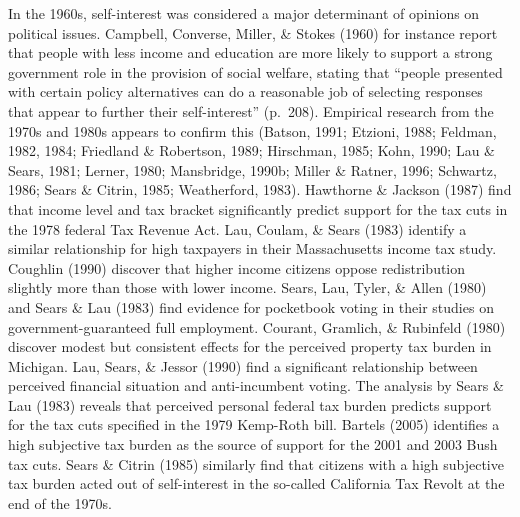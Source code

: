 \documentclass[12pt,econ]{sources/authesis}
\begin{document}
In the 1960s, self-interest was considered a major determinant of opinions on political issues. Campbell, Converse, Miller, \& Stokes (1960) for instance report that people with less income and education are more likely to support a strong government role in the provision of social welfare, stating that ``people presented with certain policy alternatives can do a reasonable job of selecting responses that appear to further their self-interest'' (p.~208). Empirical research from the 1970s and 1980s appears to confirm this (Batson, 1991; Etzioni, 1988; Feldman, 1982, 1984; Friedland \& Robertson, 1989; Hirschman, 1985; Kohn, 1990; Lau \& Sears, 1981; Lerner, 1980; Mansbridge, 1990b; Miller \& Ratner, 1996; Schwartz, 1986; Sears \& Citrin, 1985; Weatherford, 1983). Hawthorne \& Jackson (1987) find that income level and tax bracket significantly predict support for the tax cuts in the 1978 federal Tax Revenue Act. Lau, Coulam, \& Sears (1983) identify a similar relationship for high taxpayers in their Massachusetts income tax study. Coughlin (1990) discover that higher income citizens oppose redistribution slightly more than those with lower income. Sears, Lau, Tyler, \& Allen (1980) and Sears \& Lau (1983) find evidence for pocketbook voting in their studies on government-guaranteed full employment. Courant, Gramlich, \& Rubinfeld (1980) discover modest but consistent effects for the perceived property tax burden in Michigan. Lau, Sears, \& Jessor (1990) find a significant relationship between perceived financial situation and anti-incumbent voting. The analysis by Sears \& Lau (1983) reveals that perceived personal federal tax burden predicts support for the tax cuts specified in the 1979 Kemp-Roth bill. Bartels (2005) identifies a high subjective tax burden as the source of support for the 2001 and 2003 Bush tax cuts. Sears \& Citrin (1985) similarly find that citizens with a high subjective tax burden acted out of self-interest in the so-called California Tax Revolt at the end of the 1970s.
\end{document}
